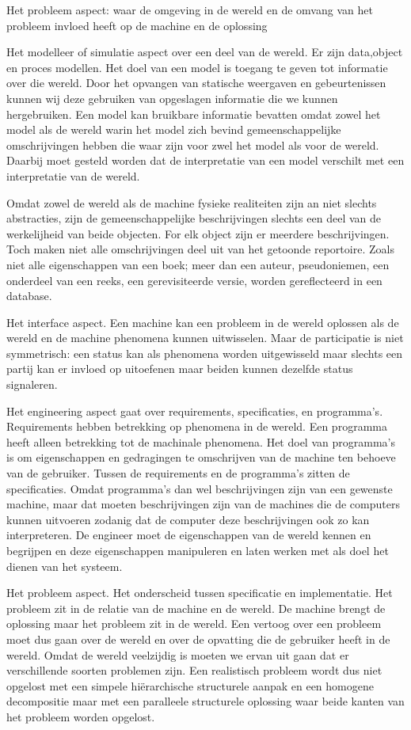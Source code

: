 Het probleem aspect: waar de omgeving in de wereld en de omvang van het probleem invloed heeft op de machine en de oplossing 

Het modelleer  of simulatie aspect over een deel van de wereld. Er zijn data,object en proces modellen. Het doel van een model is toegang te geven tot informatie over die wereld. Door het opvangen van statische weergaven en gebeurtenissen kunnen wij deze gebruiken van opgeslagen informatie die we kunnen hergebruiken. Een model kan bruikbare informatie bevatten omdat zowel het model als de wereld warin het model zich bevind gemeenschappelijke omschrijvingen hebben die waar zijn voor zwel het model als voor de wereld. Daarbij moet gesteld worden dat de interpretatie van een model verschilt met een interpretatie van de wereld. 

Omdat zowel de wereld als de machine fysieke realiteiten zijn an niet slechts abstracties, zijn de gemeenschappelijke beschrijvingen slechts een deel van de werkelijheid van beide objecten. For elk object zijn er meerdere beschrijvingen. Toch maken niet alle omschrijvingen deel uit van het getoonde reportoire. Zoals niet alle eigenschappen van een boek; meer dan een auteur, pseudoniemen, een onderdeel van een reeks, een gerevisiteerde versie, worden gereflecteerd in een database.  

Het interface aspect. Een machine kan een probleem in de wereld oplossen als de wereld en de machine phenomena kunnen uitwisselen. Maar de participatie is niet symmetrisch: een status kan als phenomena worden uitgewisseld maar slechts een partij kan er invloed op uitoefenen maar beiden kunnen dezelfde status signaleren. 

Het engineering aspect gaat over requirements, specificaties, en programma’s. Requirements hebben betrekking op phenomena in de wereld. Een programma heeft alleen betrekking tot de machinale phenomena. Het doel van programma’s is om eigenschappen en gedragingen te omschrijven van de machine ten behoeve van de gebruiker. Tussen de requirements en de programma’s zitten de specificaties. Omdat programma’s dan wel beschrijvingen zijn van een gewenste machine, maar dat moeten beschrijvingen zijn van de  machines  die de computers kunnen uitvoeren zodanig dat de computer deze beschrijvingen ook zo kan interpreteren. De engineer moet  de eigenschappen van de wereld kennen en begrijpen en deze eigenschappen manipuleren en laten werken met als doel het dienen van het systeem. 

Het probleem aspect. Het onderscheid tussen specificatie en implementatie. Het probleem zit in de relatie van de machine en de wereld. De machine brengt de oplossing maar het probleem zit in de wereld. Een vertoog over een probleem moet dus gaan over de wereld en over de opvatting die de gebruiker heeft in de wereld. Omdat de wereld veelzijdig is moeten we ervan uit gaan dat er verschillende soorten problemen zijn. Een realistisch probleem wordt dus niet opgelost met een simpele hiërarchische structurele aanpak en een homogene decompositie maar met een paralleele structurele oplossing waar beide kanten van het probleem worden opgelost. 



